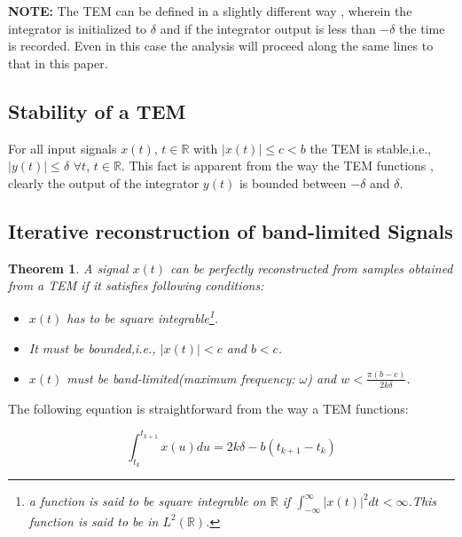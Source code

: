 \documentclass{article}
\newtheorem{theorem}{Theorem}[section]
\begin{document}
\textbf{NOTE:} The TEM can be defined in a slightly different way , wherein the integrator is initialized to $\delta$ and if the integrator output is less than $-\delta$ the time is recorded. Even in this case the analysis will proceed along the same lines to that in this paper.
\subsection{Stability of a TEM}
For all input signals $x(t)$, $t\in\mathbb{R}$ with $\vert x(t) \vert \leq c < b$ the TEM is stable,i.e., $\vert y(t) \vert \leq \delta$ $\forall t $, $t\in\mathbb{R}$. 
This fact is apparent from the way the TEM functions , clearly the output of the integrator $y(t)$ is bounded between $-\delta$ and $\delta$.
\subsection{Iterative reconstruction of band-limited Signals}
\begin{theorem}\label{th21}
A signal $x(t)$ can be perfectly reconstructed from samples obtained from a TEM if it satisfies following conditions:
\begin{itemize}
    \item $x(t)$ has to be square integrable\footnote{a function is said to be square integrable on $\mathbb{R}$ if $\int_{-\infty}^{\infty}{\vert x(t) \vert}^2dt < \infty$.This function is said to be in $L^2(\mathbb{R})$.}.
    \item It must be bounded,i.e., $\vert x(t)\vert < c$ and $b < c$.
    \item $x(t)$ must be band-limited(maximum frequency: $\omega$) and $w < \frac{\pi(b-c)}{2k\delta}$.
\end{itemize}
\end{theorem}
\vspace{0.2cm}
\begin{flushleft}
The following equation is straightforward from the way a TEM functions:   
\end{flushleft}
\begin{equation}
     \int_{t_k}^{t_{k+1}}x(u)du = 2k\delta - b(t_{k+1}-t_{k})
\end{equation}
\end{document}
